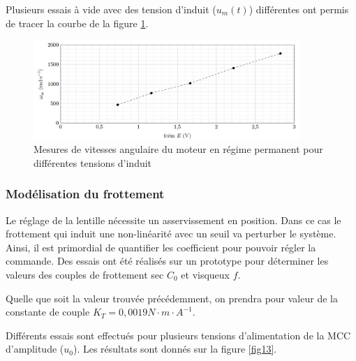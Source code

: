 Plusieurs essais à vide avec des tension d'induit ($u_m(t)$) différentes ont permis de tracer la courbe de la
figure \ref{fig12}.


\begin{figure}[!htb]
\begin{center}
\includegraphics[width=0.9\textwidth]{images/image_fig12.jpg}
\caption{Mesures de vitesses angulaire du moteur en régime permanent pour différentes tensions d’induit \label{fig12}}
\end{center}
\end{figure}

\FloatBarrier
\subsubsection{Modélisation du frottement}

Le réglage de la lentille nécessite un asservissement en position. Dans ce cas le frottement qui induit une non-linéarité avec un seuil va perturber le système. Ainsi, il est primordial de quantifier les coefficient pour pouvoir
régler la commande. Des essais ont été réalisés sur un prototype pour déterminer les valeurs des couples de
frottement sec $C_0$ et visqueux $f$.

Quelle que soit la valeur trouvée précédemment, on prendra pour valeur de la constante de couple $K_T= 0,0019 N\cdot m\cdot A^{-1}$.

Différents essais sont effectués pour plusieurs tensions d'alimentation de la MCC d'amplitude ($u_0$). Les résultats sont donnés sur
la figure \ref{fig13}.

